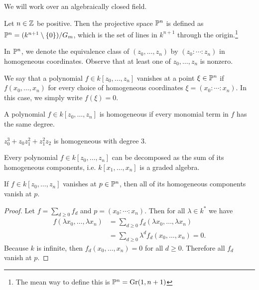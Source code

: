 \documentclass[twoside, 10pt]{article}
\begin{document}
    We will work over an algebraically closed field.

    \begin{defn}
        Let $n \in \Z$ be positive. Then the projective space $\P^n$ is defined as $\P^n = (k^{n+1} \setminus \{0\} ) / G_m$, which is the set of lines in $k^{n+1}$ through the origin.\footnote{The mean way to define this is $\P^n = \mathrm{Gr}(1,n+1)$}
    \end{defn}

    In $\P^n$, we denote the equivalence class of $(z_0, \ldots, z_n)$ by $(z_0:\cdots:z_n)$ in homogeneous coordinates. Observe that at least one of $z_0, \ldots, z_n$ is nonzero.

    \begin{defn}
        We say that a polynomial $f \in k[z_0, \ldots, z_n]$ vanishes at a point $\xi \in \P^n$ if $f(x_0, \ldots, x_n)$ for every choice of homogeneous coordinates $\xi = (x_0:\cdots:x_n)$. In this case, we simply write $f(\xi) = 0$.
    \end{defn}

    \begin{defn}
        A polynomial $f \in k[z_0, \ldots, z_n]$ is homogeneous if every monomial term in $f$ has the same degree.
    \end{defn}

    \begin{exm}
        $z_0^3 + z_0z_1^2 + z_1^2z_2$ is homogeneous with degree $3$.
    \end{exm}

    \begin{rmk}
        Every polynomial $f \in k[z_0, \ldots, z_n]$ can be decomposed as the sum of its homogeneous components, i.e. $k[x_1, \ldots, x_n]$ is a graded algebra.
    \end{rmk}

    \begin{prop}
        If $f \in k[z_0, \ldots, z_n]$ vanishes at $p \in \P^n$, then all of its homogeneous components vanish at $p$.
        \begin{proof}
            Let $f = \sum_{d \geq 0} f_d$ and $p = (x_0:\cdots:x_n)$. Then for all $\lambda \in k^*$ we have 
            \begin{align*}
                f(\lambda x_0, \ldots, \lambda x_n) &= \sum_{d \geq 0} f_d(\lambda x_0, \ldots, \lambda x_n) \\
                                                    &= \sum_{d \geq 0} \lambda^d f_d(x_0, \ldots, x_n) = 0.
            \end{align*}
            Because $k$ is infinite, then $f_d(x_0, \ldots, x_n) = 0$ for all $d \geq 0$. Therefore all $f_d$ vanish at $p$.
        \end{proof}
    \end{prop}
\end{document}
